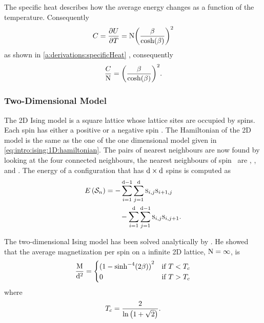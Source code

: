 	The specific heat describes how the average energy changes as a function of the temperature. Consequently
	\begin{equation*}
		C = \frac{\partial U}{\partial T} = \mathrm{N} {\left(\frac{\beta}{\cosh(\beta)}\right)}^{2}
	\end{equation*}
	as shown in \cref{a:derivations:specificHeat} \cite{warkHandout}, consequently
	\begin{equation*}
	 	\frac{C}{\mathrm{N}} = {\left(\frac{\beta}{\cosh(\beta)}\right)}^2.
	 \end{equation*}
 
\subsubsection{Two-Dimensional Model}
	\label{sss:intro:ising:2D}
	The 2D Ising model is a square lattice whose lattice sites are occupied by spins. Each spin has either a positive or a negative spin \cite{kenzel1997physics}. The Hamiltonian of the 2D model is the same as the one of the one dimensional model given in \cref{eq:intro:ising:1D:hamiltonian}. The pairs of nearest neighbours are now found by looking at the four connected neighbours, \ie the nearest neighbours of \mbox{spin } are , ,  and . The energy of a configuration  that has $\mathrm{d} \times \mathrm{d}$ spins is computed as
	\begin{equation}
		\label{eq:intro:ising:2d:energy}
		\begin{split}
		E\left(\mathcal{S}_{n} \right) 
			& = - \sum_{i = 1}^{\mathrm{d} - 1}\sum_{j = 1}^{\mathrm{d}} \textsc{s}_{i,j}\textsc{s}_{i+1,j}\\
			&\quad\quad - \sum_{i = 1}^{\mathrm{d}}\sum_{j = 1}^{\mathrm{d} - 1} \textsc{s}_{i,j} \textsc{s}_{i, j+1}.
		\end{split}
	\end{equation}

	The two-dimensional Ising model has been solved analytically by \textcite{onsager1944crystal}. He showed that the average magnetization per spin on a infinite 2D lattice, \ie $\mathrm{N} = \infty$, is
	\begin{equation}
		\label{eq:intro:ising:2D:magnetizationAnalytical}
		\frac{\mathrm{M}}{\mathrm{d}^2} = \begin{cases}
			{(1 - {\sinh}^{-4}(2\beta))}^2 & \text{if } T < T_{c}\\
			0 								& \text{if } T > T_{c}
		\end{cases}
	\end{equation}
	where
	\begin{equation*}
		T_{c} = \frac{2}{\ln \left(1 + \sqrt{2}\right)}.
	\end{equation*}

